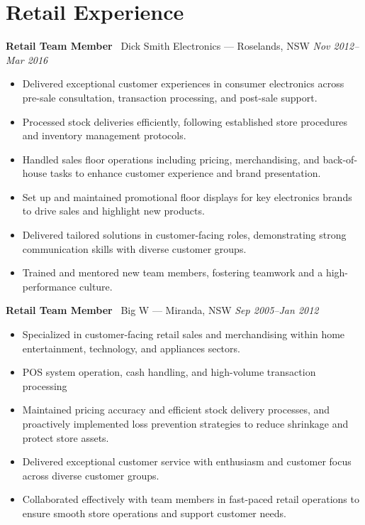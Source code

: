 \documentclass[a4paper,10pt]{article}
\begin{document}
\section*{Retail Experience}
\textbf{Retail Team Member} \textbar\ Dick Smith Electronics --- Roselands, NSW \hfill \textit{Nov 2012--Mar 2016}
\begin{itemize}[nosep,leftmargin=*,topsep=0pt,partopsep=0pt,itemsep=3pt]
\item Delivered exceptional customer experiences in consumer electronics across pre-sale consultation, transaction processing, and post-sale support.
\item Processed stock deliveries efficiently, following established store procedures and inventory management protocols.
\item Handled sales floor operations including pricing, merchandising, and back-of-house tasks to enhance customer experience and brand presentation.
\item Set up and maintained promotional floor displays for key electronics brands to drive sales and highlight new products.
\item Delivered tailored solutions in customer-facing roles, demonstrating strong communication skills with diverse customer groups.
\item Trained and mentored new team members, fostering teamwork and a high-performance culture.
\end{itemize}
\textbf{Retail Team Member} \textbar\ Big W --- Miranda, NSW \hfill \textit{Sep 2005--Jan 2012}
\begin{itemize}[nosep,leftmargin=*,topsep=0pt,partopsep=0pt,itemsep=3pt]
\item Specialized in customer-facing retail sales and merchandising within home entertainment, technology, and appliances sectors.
\item POS system operation, cash handling, and high-volume transaction processing
\item Maintained pricing accuracy and efficient stock delivery processes, and proactively implemented loss prevention strategies to reduce shrinkage and protect store assets.
\item Delivered exceptional customer service with enthusiasm and customer focus across diverse customer groups.
\item Collaborated effectively with team members in fast-paced retail operations to ensure smooth store operations and support customer needs.
\end{itemize}
\end{document}
